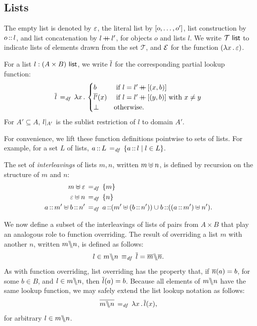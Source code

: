 \documentclass[11pt]{report}
\begin{document}
\subsection{Lists}
\label{sec:lists}

The empty list is denoted by $\lnil$, the literal list by $\llit{o,\ldots, o'}$, list construction by $o \lcons l$, and list concatenation by $l \lapp l'$, for objects $o$ and lists $l$. We write $\listof{\mathcal{T}}$ to indicate lists of elements drawn from the set $\mathcal{T}$, and $\arnil$ for the function $(\fun{x} \lnil)$. 

For a list $l : \listof{(A \times B)}$, we write $\funof{l}$ for the corresponding partial lookup function: \[ \funof{l} \eqdef \fun{x} \begin{cases}
  b &\text{ if $l = l' \lapp \llit{(x,b)}$}\\
  \funof{l'}(x) &\text{ if $l = l' \lapp \llit{(y,b)}$ with $x \neq y$}\\
  \bot & \text{otherwise.}
\end{cases}\] For $A' \subseteq A$, $\restrict{l}{A'}$ is the sublist restriction of $l$ to domain $A'$.

For convenience, we lift these function definitions pointwise to sets of lists. For example, for a set $L$ of lists, $a \lcons L \eqdef \setof{a \lcons l}{l \in L}$. 

The set of \emph{interleavings} of lists $m,n$, written $m \merge n$, is defined by recursion on the structure of $m$ and $n$: \begin{align*}
  m \merge \lnil &\eqdef \set{m} \\
  \lnil \merge n &\eqdef \set{n} \\ 
  a \lcons m' \merge b \lcons n' & \eqdef a \lcons (m' \merge (b\lcons n')) \cup b \lcons ((a \lcons m') \merge n').
\end{align*}

We now define a subset of the interleavings of lists of pairs from $A \times B$ that play an analogous role to function overriding. The result of overriding a list $m$ with another $n$, written $m \override n$, is defined as follows: \[ l \in m \override n \iffdef \funof{l} = \funof{m} \override \funof{n}.\] As with function overriding, list overriding has the property that, if $\funof{n}(a) = b$, for some $b \in B$, and $l \in m \override n$, then $\funof{l}(a) = b$. Because all elements of $m \override n$ have the same lookup function, we may safely extend the list lookup notation as follows: \[ \funof{m \override n} \eqdef \fun{x} \funof{l}(x),\] for arbitrary $l \in m \override n$. 
\end{document}
